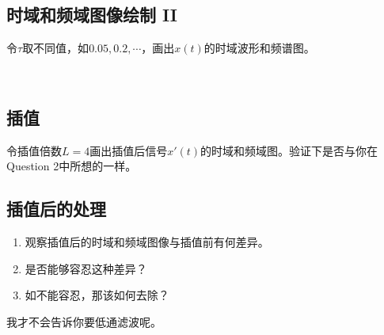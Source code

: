 \documentclass{article}
\begin{document}
\subsection{时域和频域图像绘制 II}
令$\tau$取不同值，如$0.05,0.2,\cdots$，画出$x(t)$的时域波形和频谱图。\\
\\
{\small \setmainfont{AR PL UKai CN}{
Tips: 当绘出全部时间的图形时，图像会显得过于密集反而不利于观测，这时可像Figure 1一样只绘出一小段时间片的图像}}
\subsection{插值}
令插值倍数$L=4$画出插值后信号$x'(t)$的时域和频域图。验证下是否与你在Question 2中所想的一样。
\subsection{插值后的处理}
\begin{enumerate}
\item 观察插值后的时域和频域图像与插值前有何差异。
\item 是否能够容忍这种差异？
\item 如不能容忍，那该如何去除？
\end{enumerate}
我才不会告诉你要低通滤波呢。
\end{document}
